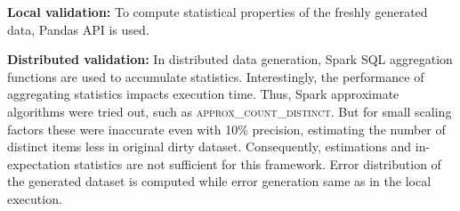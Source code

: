 \textbf{Local validation:} To compute statistical properties of the freshly generated data, Pandas API is used.

\textbf{Distributed validation:} 
In distributed data generation, Spark SQL aggregation functions are used to accumulate statistics.
Interestingly, the performance of aggregating statistics impacts execution time. 
Thus, Spark approximate algorithms were tried out, such as \textsc{approx\_count\_distinct}.
But for small scaling factors these were inaccurate even with 10\% precision, estimating the number of distinct items less in original dirty dataset.
Consequently, estimations and in-expectation statistics are not sufficient for this framework.
Error distribution of the generated dataset is computed while error generation same as in the local execution.
